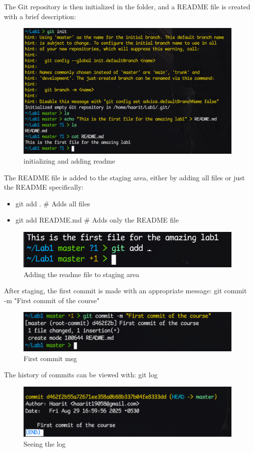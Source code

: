 \documentclass[a4paper,12pt,twoside,english]{all-in-one} %
\begin{document}
The Git repository is then initialized in the folder, and a README file is created with a brief description:
\begin{figure}[H]
    \centering
    \includegraphics[width=0.75\linewidth]{image04.png}
    \caption{initializing and adding readme}
    \label{fig:placeholder}
\end{figure}



The README file is added to the staging area, either by adding all files or just the README 
specifically:
\begin{itemize}
    \item git add .           # Adds all files
    \item git add README.md   # Adds only the README file
\end{itemize}
\begin{figure}[H]
    \centering
    \includegraphics[width=0.5\linewidth]{image05.png}
    \caption{Adding the readme file to staging area}
    \label{fig:placeholder}
\end{figure}


After staging, the first commit is made with an appropriate message: git commit -m "First commit of the course"

\begin{figure}[H]
    \centering
    \includegraphics[width=0.5\linewidth]{image06.png}
    \caption{First commit msg}
    \label{fig:placeholder}
\end{figure}



The history of commits can be viewed with: git log
\begin{figure}[H]
    \centering
    \includegraphics[width=0.75\linewidth]{image07.png}
    \caption{Seeing the log}
    \label{fig:placeholder}
\end{figure}
\end{document}
